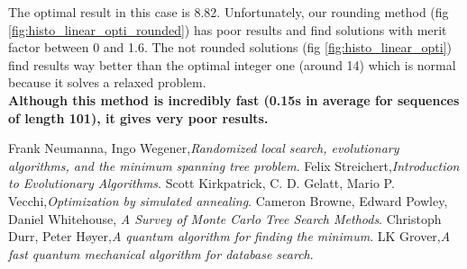 \documentclass[a4paper,11pt,openany]{article}
\begin{document}
\noindent
The optimal result in this case is 8.82. Unfortunately, our rounding method (fig \ref{fig:histo_linear_opti_rounded}) has poor results and find solutions with merit factor between 0 and 1.6. The not rounded solutions (fig \ref{fig:histo_linear_opti}) find results way better than the optimal integer one (around 14) which is normal because it solves a relaxed problem.\\
\textbf{Although this method is incredibly fast (0.15s in average for sequences of length 101), it gives very poor results.}

\begin{thebibliography}{999}

Frank Neumanna, Ingo Wegener,\emph{Randomized local search, evolutionary algorithms, and the minimum spanning tree problem}.  
Felix Streichert,\emph{Introduction to Evolutionary Algorithms}. 
Scott Kirkpatrick, C. D. Gelatt, Mario P. Vecchi,\emph{Optimization by simulated annealing}.
Cameron Browne, Edward Powley, Daniel Whitehouse,\emph{ A Survey of Monte Carlo Tree Search Methods}.  
Christoph Durr, Peter Høyer,\emph{A quantum algorithm for finding the minimum}.   
LK Grover,\emph{A fast quantum mechanical algorithm for database search}. 




\end{thebibliography}
\end{document}
